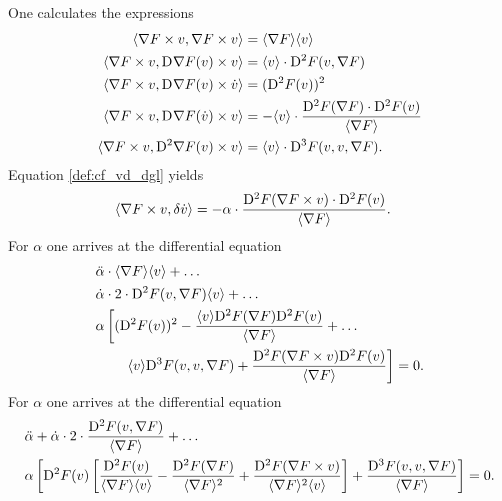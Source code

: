 One calculates the expressions
\begin{subequations}
    \begin{align}
        \langle  \nabla F  \times v ,  \nabla F  \times v  \rangle  &=
        \langle  \nabla F   \rangle \langle  v  \rangle\\
        \langle  \nabla F  \times v ,  \mathrm{D}^{  } \nabla F  ( v ) \times v  \rangle  &=
        \langle  v  \rangle \cdot \mathrm{D}^{ 2 } F ( v, \nabla F  )\\
        \langle  \nabla F  \times v ,  \mathrm{D}^{  } \nabla F  ( v ) \times \dot{ v }  \rangle  &=
        ( \mathrm{D}^{ 2 } F ( v ) )^2\\
        \langle  \nabla F  \times v ,  \mathrm{D}^{  } \nabla F  ( \dot{ v } ) \times v  \rangle  &=
        -  \langle  v  \rangle \cdot \frac{ \mathrm{D}^{ 2 } F ( \nabla F  ) \cdot \mathrm{D}^{ 2 } F ( v ) }{ \langle  \nabla F   \rangle }\\
        \langle  \nabla F  \times v ,  \mathrm{D}^{ 2 } \nabla F  ( v ) \times v  \rangle  &=
        \langle  v  \rangle \cdot \mathrm{D}^{ 3 } F ( v, v, \nabla F  ) .
    \end{align}
\end{subequations}
Equation \eqref{def:cf_vd_dgl} yields
\begin{align}
    \langle  \nabla F  \times v ,  \delta \dot{ v }  \rangle  &=
    -\alpha \cdot \frac{ \mathrm{D}^{ 2 } F ( \nabla F  \times v ) \cdot \mathrm{D}^{ 2 } F ( v ) }{ \langle  \nabla F   \rangle } .
\end{align}
For $ \alpha $ one arrives at the differential equation
\begin{align}
    &\ddot{ \alpha } \cdot \langle  \nabla F   \rangle \langle  v  \rangle  +  \dots\nonumber\\
    &\dot{ \alpha } \cdot 2 \cdot \mathrm{D}^{ 2 } F ( v, \nabla F  ) \langle  v  \rangle  +  \dots\nonumber\\
    &\alpha \left[ ( \mathrm{D}^{ 2 } F ( v ) )^2  -
    \frac{ \langle  v  \rangle \mathrm{D}^{ 2 } F ( \nabla F  ) \mathrm{D}^{ 2 } F ( v ) }{ \langle  \nabla F   \rangle }  +  \dots\right.\nonumber\\
    &\qquad\left.\langle  v  \rangle \mathrm{D}^{ 3 } F ( v, v, \nabla F  )  +
    \frac{ \mathrm{D}^{ 2 } F ( \nabla F  \times v ) \mathrm{D}^{ 2 } F ( v ) }{ \langle  \nabla F   \rangle } \right]  =  0 .
\end{align}
For $ \alpha $ one arrives at the differential equation
\begin{align}
    &\ddot{ \alpha }  +
    \dot{ \alpha } \cdot 2 \cdot \frac{ \mathrm{D}^{ 2 } F ( v, \nabla F  ) }
    { \langle  \nabla F   \rangle }  +  \dots\nonumber\\
    &\alpha \left[ \mathrm{D}^{ 2 } F ( v ) \left[ \frac{ \mathrm{D}^{ 2 } F ( v ) }{ \langle  \nabla F   \rangle \langle  v  \rangle }  -
    \frac{ \mathrm{D}^{ 2 } F ( \nabla F  ) }{ \langle  \nabla F   \rangle^2 }  +
    \frac{ \mathrm{D}^{ 2 } F ( \nabla F  \times v ) }{ \langle  \nabla F   \rangle^2 \langle  v  \rangle } \right]  +
    \frac{ \mathrm{D}^{ 3 } F ( v, v, \nabla F  ) }{ \langle  \nabla F   \rangle } \right]  =  0 .
\end{align}

